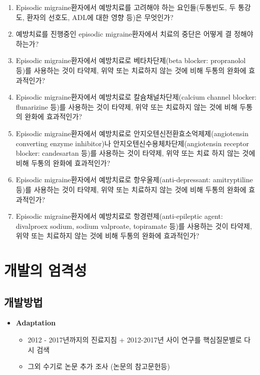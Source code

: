 \documentclass[]{book}
\providecommand{\tightlist}{%
  \setlength{\itemsep}{0pt}\setlength{\parskip}{0pt}}
\begin{document}
\begin{enumerate}
\def\labelenumi{\arabic{enumi}.}
\item
  Episodic migraine환자에서 예방치료를 고려해야 하는 요인들(두통빈도, 두 통강도, 환자의 선호도, ADL에 대한 영향 등)은 무엇인가?
\item
  예방치료를 진행중인 episodic migraine환자에서 치료의 중단은 어떻게 결 정해야 하는가?
\item
  Episodic migraine환자에서 예방치료로 베타차단제(beta blocker: propranolol 등)를 사용하는 것이 타약제, 위약 또는 치료하지 않는 것에 비해 두통의 완화에 효과적인가?
\item
  Episodic migraine환자에서 예방치료로 칼슘채널차단제(calcium channel blocker: flunarizine 등)를 사용하는 것이 타약제, 위약 또는 치료하지 않는 것에 비해 두통의 완화에 효과적인가?
\item
  Episodic migraine환자에서 예방치료로 안지오텐신전환효소억제제(angiotensin converting enzyme inhibitor)나 안지오텐신수용체차단제(angiotensin receptor blocker: candesartan 등)를 사용하는 것이 타약제, 위약 또는 치료 하지 않는 것에 비해 두통의 완화에 효과적인가?
\item
  Episodic migraine환자에서 예방치료로 항우울제(anti-depressant: amitryptiline 등)를 사용하는 것이 타약제, 위약 또는 치료하지 않는 것에 비해 두통의 완화에 효과적인가?
\item
  Episodic migraine환자에서 예방치료로 항경련제(anti-epileptic agent: divalproex sodium, sodium valproate, topiramate 등)를 사용하는 것이 타약제, 위약 또는 치료하지 않는 것에 비해 두통의 완화에 효과적인가?
\end{enumerate}

\hypertarget{section-53}{%
\chapter{개발의 엄격성}\label{section-53}}

\hypertarget{section-54}{%
\section{개발방법}\label{section-54}}

\begin{itemize}
\tightlist
\item
  \textbf{Adaptation}

  \begin{itemize}
  \tightlist
  \item
    2012 - 2017년까지의 진료지침 + 2012-2017년 사이 연구를 핵심질문별로 다시 검색
  \item
    그외 수기로 논문 추가 조사 (논문의 참고문헌등)
  \end{itemize}
\end{itemize}
\end{document}
